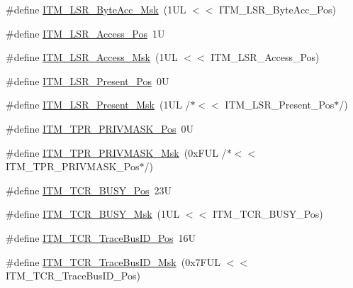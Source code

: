 \begin{DoxyCompactItemize}
\item 
\#define \mbox{\hyperlink{group___c_m_s_i_s___i_t_m_ga91f492b2891bb8b7eac5b58de7b220f4}{I\+T\+M\+\_\+\+L\+S\+R\+\_\+\+Byte\+Acc\+\_\+\+Msk}}~(1\+U\+L $<$$<$ I\+T\+M\+\_\+\+L\+S\+R\+\_\+\+Byte\+Acc\+\_\+\+Pos)
\item 
\#define \mbox{\hyperlink{group___c_m_s_i_s___i_t_m_ga144a49e12b83ad9809fdd2769094fdc0}{I\+T\+M\+\_\+\+L\+S\+R\+\_\+\+Access\+\_\+\+Pos}}~1U
\item 
\#define \mbox{\hyperlink{group___c_m_s_i_s___i_t_m_gac8ae69f11c0311da226c0c8ec40b3d37}{I\+T\+M\+\_\+\+L\+S\+R\+\_\+\+Access\+\_\+\+Msk}}~(1\+U\+L $<$$<$ I\+T\+M\+\_\+\+L\+S\+R\+\_\+\+Access\+\_\+\+Pos)
\item 
\#define \mbox{\hyperlink{group___c_m_s_i_s___i_t_m_gaf5740689cf14564d3f3fd91299b6c88d}{I\+T\+M\+\_\+\+L\+S\+R\+\_\+\+Present\+\_\+\+Pos}}~0U
\item 
\#define \mbox{\hyperlink{group___c_m_s_i_s___i_t_m_gaa5bc2a7f5f1d69ff819531f5508bb017}{I\+T\+M\+\_\+\+L\+S\+R\+\_\+\+Present\+\_\+\+Msk}}~(1\+U\+L /$\ast$$<$$<$ I\+T\+M\+\_\+\+L\+S\+R\+\_\+\+Present\+\_\+\+Pos$\ast$/)
\item 
\#define \mbox{\hyperlink{group___c_m_s_i_s___i_t_m_ga7abe5e590d1611599df87a1884a352e8}{I\+T\+M\+\_\+\+T\+P\+R\+\_\+\+P\+R\+I\+V\+M\+A\+S\+K\+\_\+\+Pos}}~0U
\item 
\#define \mbox{\hyperlink{group___c_m_s_i_s___i_t_m_ga168e089d882df325a387aab3a802a46b}{I\+T\+M\+\_\+\+T\+P\+R\+\_\+\+P\+R\+I\+V\+M\+A\+S\+K\+\_\+\+Msk}}~(0x\+F\+U\+L /$\ast$$<$$<$ I\+T\+M\+\_\+\+T\+P\+R\+\_\+\+P\+R\+I\+V\+M\+A\+S\+K\+\_\+\+Pos$\ast$/)
\item 
\#define \mbox{\hyperlink{group___c_m_s_i_s___i_t_m_ga9174ad4a36052c377cef4e6aba2ed484}{I\+T\+M\+\_\+\+T\+C\+R\+\_\+\+B\+U\+S\+Y\+\_\+\+Pos}}~23U
\item 
\#define \mbox{\hyperlink{group___c_m_s_i_s___i_t_m_ga43ad7cf33de12f2ef3a412d4f354c60f}{I\+T\+M\+\_\+\+T\+C\+R\+\_\+\+B\+U\+S\+Y\+\_\+\+Msk}}~(1\+U\+L $<$$<$ I\+T\+M\+\_\+\+T\+C\+R\+\_\+\+B\+U\+S\+Y\+\_\+\+Pos)
\item 
\#define \mbox{\hyperlink{group___c_m_s_i_s___i_t_m_gaca0281de867f33114aac0636f7ce65d3}{I\+T\+M\+\_\+\+T\+C\+R\+\_\+\+Trace\+Bus\+I\+D\+\_\+\+Pos}}~16U
\item 
\#define \mbox{\hyperlink{group___c_m_s_i_s___i_t_m_ga60c20bd9649d1da5a2be8e656ba19a60}{I\+T\+M\+\_\+\+T\+C\+R\+\_\+\+Trace\+Bus\+I\+D\+\_\+\+Msk}}~(0x7\+F\+U\+L $<$$<$ I\+T\+M\+\_\+\+T\+C\+R\+\_\+\+Trace\+Bus\+I\+D\+\_\+\+Pos)
\item 

\end{DoxyCompactItemize}
